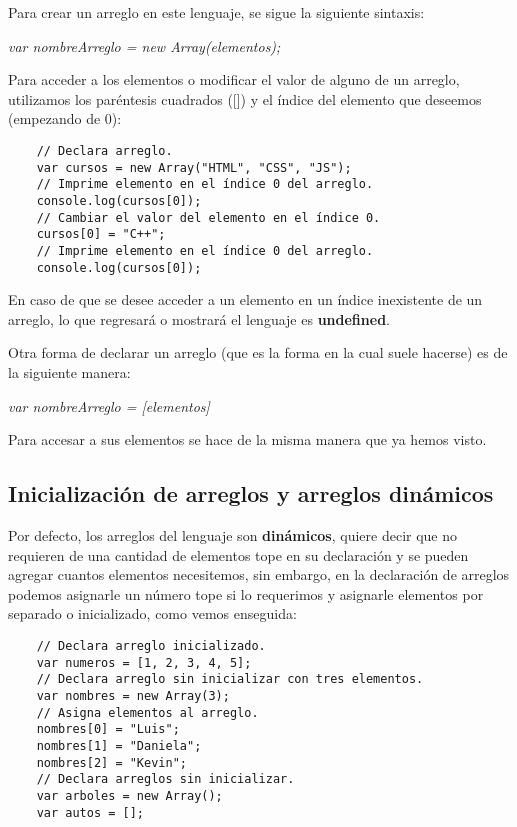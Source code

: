 Para crear un arreglo en este lenguaje, se sigue la siguiente sintaxis:
\begin{center}
    \textit{var nombreArreglo = new Array(elementos);}
\end{center}

Para acceder a los elementos o modificar el valor de alguno de un arreglo, utilizamos los paréntesis cuadrados ([]) y el índice del elemento que deseemos (empezando de 0):
\begin{lstlisting}
    // Declara arreglo.
    var cursos = new Array("HTML", "CSS", "JS");
    // Imprime elemento en el índice 0 del arreglo.
    console.log(cursos[0]);
    // Cambiar el valor del elemento en el índice 0.
    cursos[0] = "C++";
    // Imprime elemento en el índice 0 del arreglo.
    console.log(cursos[0]);
\end{lstlisting}

En caso de que se desee acceder a un elemento en un índice inexistente de un arreglo, lo que regresará o mostrará el lenguaje es \textbf{undefined}.

Otra forma de declarar un arreglo (que es la forma en la cual suele hacerse) es de la siguiente manera:
\begin{center}
    \textit{var nombreArreglo = [elementos]}
\end{center}

Para accesar a sus elementos se hace de la misma manera que ya hemos visto.


\subsection{Inicialización de arreglos y arreglos dinámicos}

Por defecto, los arreglos del lenguaje son \textbf{dinámicos}, quiere decir que no requieren de una cantidad de elementos tope en su declaración y se pueden agregar cuantos elementos necesitemos, sin embargo, en la declaración de arreglos podemos asignarle un número tope si lo requerimos y asignarle elementos por separado o inicializado, como vemos enseguida:
\begin{lstlisting}
    // Declara arreglo inicializado.
    var numeros = [1, 2, 3, 4, 5];
    // Declara arreglo sin inicializar con tres elementos.
    var nombres = new Array(3);
    // Asigna elementos al arreglo.
    nombres[0] = "Luis";
    nombres[1] = "Daniela";
    nombres[2] = "Kevin";
    // Declara arreglos sin inicializar.
    var arboles = new Array();
    var autos = [];
\end{lstlisting}


